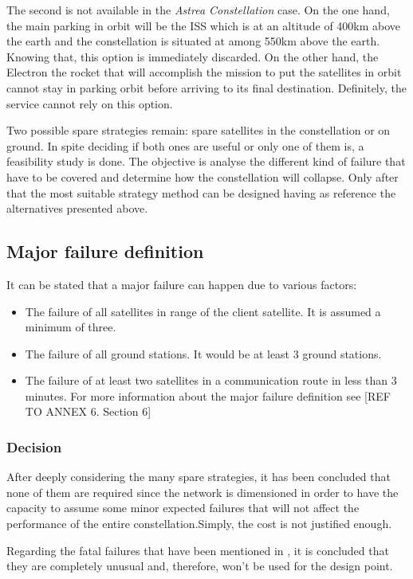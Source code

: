 The second is not available in the \textit{Astrea Constellation} case. On the one hand, the main parking in orbit will be the ISS which is at an altitude of 400km above the earth and the constellation is situated at among 550km above the earth. Knowing that, this option is immediately discarded. On the other hand, the Electron the rocket that will accomplish the mission to put the satellites in orbit cannot stay in parking orbit before arriving to its final destination. Definitely, the service cannot rely on this option.

Two possible spare strategies remain: spare satellites in the constellation or on ground. In spite deciding if both ones are useful or only one of them is, a feasibility study is done. The objective is analyse the different kind of failure that have to be covered and determine how the constellation will collapse. Only after that the most suitable strategy method can be designed having as reference the alternatives presented above. 

\subsection{Major failure definition}
It can be stated that a major failure can happen due to various factors:
\begin{itemize}
\item The failure of all satellites in range of the client satellite. It is assumed a minimum of three.
\item The failure of all ground stations. It would be at least 3 ground stations.
\item The failure of at least two satellites in a communication route in less than 3 minutes.
\newline\newline
For more information about the major failure definition see [{REF TO ANNEX 6. Section 6}]
\end{itemize}

\subsubsection{Decision}
After deeply considering the many spare strategies, it has been concluded that none of them are required since the network is dimensioned in order to have the capacity to assume some minor expected failures that will not affect the performance of the entire constellation.Simply, the cost is not justified enough.

Regarding the fatal failures that have been mentioned in \cite[Chaper 1. Section 1.4]{annex2}, it is concluded that they are completely unusual and, therefore, won't be used for the design point.

